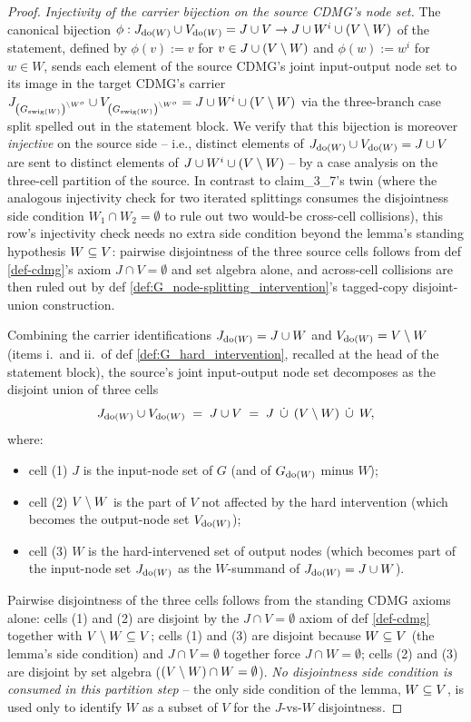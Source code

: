\documentclass[main]{subfiles}
\begin{document}
\begin{proof}
\medskip\noindent\emph{Injectivity of the carrier bijection on the source CDMG's node set.}
The canonical bijection $\phi : J_{\operatorname{do}(W)} \cup V_{\operatorname{do}(W)} = J \cup V \to J \cup W^i \cup (V \setminus W)$ of the statement, defined by $\phi(v) := v$ for $v \in J \cup (V \setminus W)$ and $\phi(w) := w^i$ for $w \in W$, sends each element of the source CDMG's joint input-output node set to its image in the target CDMG's carrier $J_{\left ( G_{\mathrm{swig}(W)} \right )^{\setminus W^o}} \cup V_{\left ( G_{\mathrm{swig}(W)} \right )^{\setminus W^o}} = J \cup W^i \cup (V \setminus W)$ via the three-branch case split spelled out in the statement block. We verify that this bijection is moreover \emph{injective} on the source side -- i.e., distinct elements of $J_{\operatorname{do}(W)} \cup V_{\operatorname{do}(W)} = J \cup V$ are sent to distinct elements of $J \cup W^i \cup (V \setminus W)$ -- by a case analysis on the three-cell partition of the source. In contrast to claim_3_7's twin (where the analogous injectivity check for two iterated splittings consumes the disjointness side condition $W_1 \cap W_2 = \emptyset$ to rule out two would-be cross-cell collisions), this row's injectivity check needs no extra side condition beyond the lemma's standing hypothesis $W \subseteq V$: pairwise disjointness of the three source cells follows from def \ref{def-cdmg}'s axiom $J \cap V = \emptyset$ and set algebra alone, and across-cell collisions are then ruled out by def \ref{def:G_node-splitting_intervention}'s tagged-copy disjoint-union construction.

Combining the carrier identifications $J_{\operatorname{do}(W)} = J \cup W$ and $V_{\operatorname{do}(W)} = V \setminus W$ (items i.\ and ii.\ of def \ref{def:G_hard_intervention}, recalled at the head of the statement block), the source's joint input-output node set decomposes as the disjoint union of three cells
\[
    J_{\operatorname{do}(W)} \cup V_{\operatorname{do}(W)} \;=\; J \cup V \;=\; J \;\,\dot{\cup}\,\; (V \setminus W) \;\,\dot{\cup}\,\; W,
\]
where:
\begin{itemize}
    \item cell (1) $J$ is the input-node set of $G$ (and of $G_{\operatorname{do}(W)}$ minus $W$);
    \item cell (2) $V \setminus W$ is the part of $V$ not affected by the hard intervention (which becomes the output-node set $V_{\operatorname{do}(W)}$);
    \item cell (3) $W$ is the hard-intervened set of output nodes (which becomes part of the input-node set $J_{\operatorname{do}(W)}$ as the $W$-summand of $J_{\operatorname{do}(W)} = J \cup W$).
\end{itemize}
Pairwise disjointness of the three cells follows from the standing CDMG axioms alone: cells (1) and (2) are disjoint by the $J \cap V = \emptyset$ axiom of def \ref{def-cdmg} together with $V \setminus W \subseteq V$; cells (1) and (3) are disjoint because $W \subseteq V$ (the lemma's side condition) and $J \cap V = \emptyset$ together force $J \cap W = \emptyset$; cells (2) and (3) are disjoint by set algebra ($(V \setminus W) \cap W = \emptyset$). \emph{No disjointness side condition is consumed in this partition step} -- the only side condition of the lemma, $W \subseteq V$, is used only to identify $W$ as a subset of $V$ for the $J$-vs-$W$ disjointness.


\end{proof}
\end{document}
